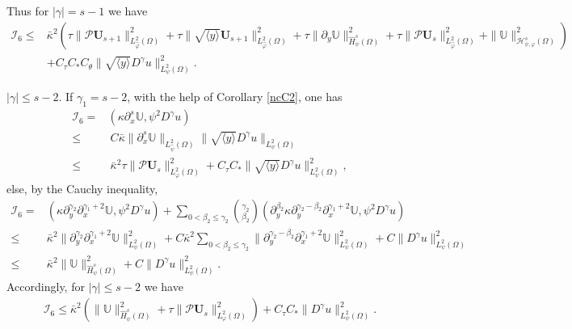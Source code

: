 \documentclass{amsart}
\numberwithin{equation}{section}
\newcommand\y{{{\langle y \rangle}}}
\begin{document}
Thus for $|\gamma|=s-1$ we have
\begin{align*}
\mathcal{I}_{6}
\leq& \bar{\kappa}^{2}\left(\tau\|\mathcal{P}\mathbf{U}_{s+1}\|_{L_{\hat{\varphi}}^{2}(\Omega)}^{2}
                +\tau\|\sqrt{\y}\mathbf{U}_{s+1}\|_{L_{\hat{\varphi}}^{2}(\Omega)}^{2}
                +\tau\|\partial_{y}\mathbb{U}\|_{\hat{H}_{\psi}^{s}(\Omega)}^{2}
                +\tau\|\mathcal{P}\mathbf{U}_{s}\|_{L_{\hat{\varphi}}^{2}(\Omega)}^{2}
                +\|\mathbb{U}\|_{\mathcal{H}_{\psi,\varphi}^{s}(\Omega)}^{2}\right)\\
    &+C_{\tau}C_{*}C_{\theta}\|\sqrt{\y}D^{\gamma}u\|_{L_{\psi}^{2}(\Omega)}^{2}.
\end{align*}



 $|\gamma|\leq s-2$.
If $\gamma_{1}=s-2$, with the help of Corollary \ref{ncC2}, one has
\begin{align*}
\mathcal{I}_{6}
=&(\kappa\partial_{x}^{s}\mathbb{U}, \psi^{2}D^{\gamma}u)\\
\leq&~C\bar{\kappa}\|\partial_{x}^{s}\mathbb{U}\|_{L_{\hat{\psi}}^{2}(\Omega)}\|\sqrt{\y}D^{\gamma}u\|_{L_{\psi}^{2}(\Omega)}\\
\leq&~\bar{\kappa}^{2}\tau\|\mathcal{P}\mathbf{U}_{s}\|_{L_{\varphi}^{2}(\Omega)}^{2}
     +C_{\tau}C_{*}\|\sqrt{\y}D^{\gamma}u\|_{L_{\psi}^{2}(\Omega)}^{2},
\end{align*}
else, by the Cauchy inequality,
\begin{align*}
\mathcal{I}_{6}
=&(\kappa\partial_{y}^{\gamma_{2}}\partial_{x}^{\gamma_{1}+2}\mathbb{U},\psi^{2}D^{\gamma}u)
  +\sum_{0<\beta_{2}\leq\gamma_{2}}\binom{\gamma_{2}}{\beta_{2}}
   (\partial_{y}^{\beta_{2}}\kappa\partial_{y}^{\gamma_{2}-\beta_{2}}\partial_{x}^{\gamma_{1}+2}\mathbb{U},\psi^{2}D^{\gamma}u)\\
\leq& \bar{\kappa}^{2}\|\partial_{y}^{\gamma_{2}}\partial_{x}^{\gamma_{1}+2}\mathbb{U}\|_{L_{\psi}^{2}(\Omega)}^{2}
     +C\bar{\kappa}^{2}\sum_{0<\beta_{2}\leq\gamma_{2}}\|\partial_{y}^{\gamma_{2}-\beta_{2}}\partial_{x}^{\gamma_{1}+2}\mathbb{U}\|_{L_{\psi}^{2}(\Omega)}^{2}
     +C\|D^{\gamma}u\|_{L_{\psi}^{2}(\Omega)}^{2}\\
\leq& \bar{\kappa}^{2}\|\mathbb{U}\|_{\hat{H}_{\psi}^{s}(\Omega)}^{2}
     +C\|D^{\gamma}u\|_{L_{\psi}^{2}(\Omega)}^{2}.
\end{align*}
Accordingly, for $|\gamma|\leq s-2$ we have
\begin{align*}
\mathcal{I}_{6}
\leq\bar{\kappa}^{2}\left(\|\mathbb{U}\|_{\hat{H}_{\psi}^{s}(\Omega)}^{2}+\tau\|\mathcal{P}\mathbf{U}_{s}\|_{L_{\varphi}^{2}(\Omega)}^{2}\right)
    +C_{\tau}C_{*}\|D^{\gamma}u\|_{L_{\psi}^{2}(\Omega)}^{2}.
\end{align*}
\end{document}
